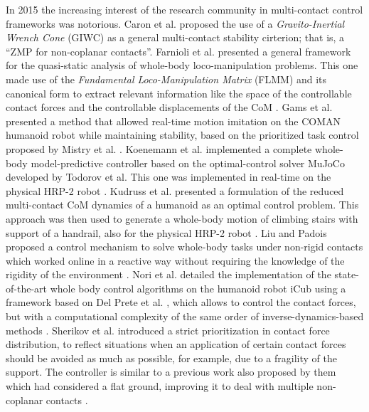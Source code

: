 	In 2015 the increasing interest of the research community in multi-contact control frameworks was
	notorious.
	Caron et al. \cite{Caron_RSS2015} proposed the use of a \emph{Gravito-Inertial Wrench Cone} (GIWC)
	as a general multi-contact stability cirterion; that is, a ``ZMP for non-coplanar contacts''.
	Farnioli et al. \cite{Farnioli_ICRA2015} presented a general framework for the quasi-static analysis
	of whole-body loco-manipulation problems.
	This one made use of the \emph{Fundamental Loco-Manipulation Matrix} (FLMM) and its canonical form
	to extract relevant information like the space of the controllable contact forces and the controllable
	displacements of the CoM \cite{Farnioli_ICRA2015}.
	Gams et al. \cite{Gams_Robotica2015} presented a method that allowed real-time motion imitation on
	the COMAN humanoid robot while maintaining stability, based on the prioritized task control proposed
	by Mistry et al. \cite{Mistry_IROS2007}.
	Koenemann et al. \cite{Koenemann_IROS2015} implemented a complete whole-body model-predictive controller
	based on the optimal-control solver MuJoCo developed by Todorov et al. \cite{Todorov_IROS2012}
	This one was implemented in real-time on the physical HRP-2 robot \cite{Koenemann_IROS2015}.
	Kudruss et al. \cite{Kudruss_Humanoids2015} presented a formulation of the reduced multi-contact CoM
	dynamics of a humanoid as an optimal control problem.
	This approach was then used to generate a whole-body motion of climbing stairs with support of a
	handrail, also for the physical HRP-2 robot \cite{Kudruss_Humanoids2015}.
	Liu and Padois \cite{LiuM_IROS2015} proposed a control mechanism to solve whole-body tasks under
	non-rigid contacts which worked online in a reactive way without requiring the knowledge of the
	rigidity of the environment \cite{LiuM_IROS2015}.
	Nori et al. \cite{Nori_FrontRobAI2015} detailed the implementation of the state-of-the-art whole
	body control algorithms on the humanoid robot iCub using a framework based on Del Prete et al.
	\cite{DelPrete_IROS2014}, which allows to control the contact forces, but with a computational
	complexity of the same order of inverse-dynamics-based methods \cite{Nori_FrontRobAI2015}.
	Sherikov et al. \cite{Sherikov_Humanoids2015} introduced a strict prioritization in contact force
	distribution, to reflect situations when an application of certain contact forces should be avoided
	as much as possible, for example, due to a fragility of the support.
	The controller is similar to a previous work also proposed by them \cite{Sherikov_Humanoids2014}
	which had considered a flat ground, improving it to deal with multiple non-coplanar contacts
	\cite{Sherikov_Humanoids2015}.
	
